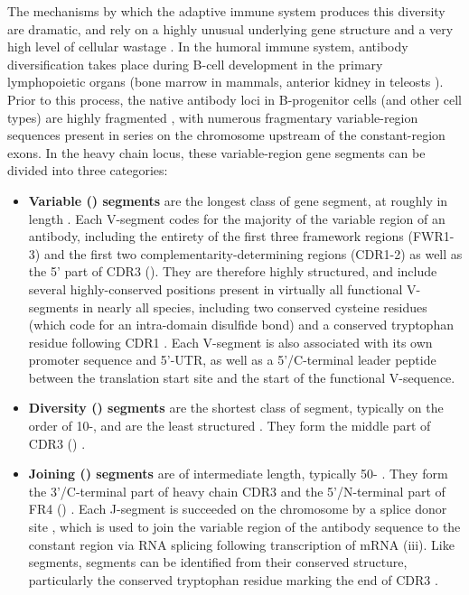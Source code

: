 The mechanisms by which the adaptive immune system produces this diversity are dramatic, and rely on a highly unusual underlying gene structure \parencite{jung2006vdjr} and a very high level of cellular wastage \parencite{kogut2012bcells}. In the humoral immune system, antibody diversification takes place during B-cell development in the primary lymphopoietic organs (bone marrow in mammals, anterior kidney in teleosts \parencite{sunyer2013fishing}). Prior to this process, the native antibody loci in B-progenitor cells (and other cell types) are highly fragmented \parencite{jung2006vdjr}, with numerous fragmentary variable-region sequences present in series on the chromosome upstream of the constant-region exons. In the heavy chain locus, these variable-region gene segments can be divided into three categories:

\begin{itemize}
\item \textbf{Variable (\vh) segments} are the longest class of gene segment, at roughly  in length \parencite{lefranc2003vnumbering}. Each V-segment codes for the majority of the variable region of an antibody, including the entirety of the first three framework regions (FWR1-3) and the first two complementarity-determining regions (CDR1-2) as well as the 5' part of CDR3 \parencite{schroeder2010immunoglobulins,jung2006vdjr} (). They are therefore highly structured, and include several highly-conserved positions present in virtually all functional V-segments in nearly all species, including two conserved cysteine residues (which code for an intra-domain disulfide bond) and a conserved tryptophan residue following CDR1 \parencite{lefranc2003vnumbering}. Each V-segment is also associated with its own promoter sequence and 5'-UTR, as well as a 5'/C-terminal leader peptide between the translation start site and the start of the functional V-sequence.
\item \textbf{Diversity (\dh) segments} are the shortest class of segment, typically on the order of 10-, and are the least structured \parencite{ruiz1999humandj}. They form the middle part of CDR3 () \parencite{schroeder2010immunoglobulins}.
\item \textbf{Joining (\jh) segments} are of intermediate length, typically 50- \parencite{ruiz1999humandj}. They form the 3'/C-terminal part of heavy chain CDR3 and the 5'/N-terminal part of FR4 () \parencite{schroeder2010immunoglobulins}. Each J-segment is succeeded on the chromosome by a splice donor site \parencite{magadan2011medaka}, which is used to join the variable region of the antibody sequence to the constant region via RNA splicing following transcription of \igh{} mRNA (iii). Like \vh segments, \jh segments can be identified from their conserved structure, particularly the conserved tryptophan residue marking the end of CDR3 \parencite{ruiz1999humandj}.
\end{itemize}


